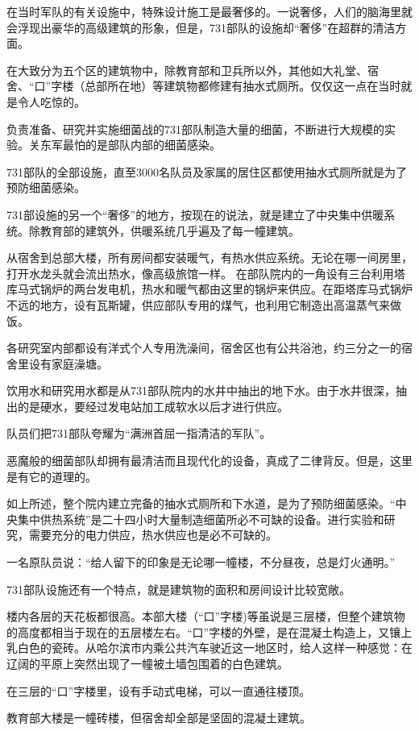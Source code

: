\documentclass[a4paper,12pt,UTF8,twoside]{ctexbook}
\begin{document}
在当时军队的有关设施中，特殊设计施工是最奢侈的。一说奢侈，人们的脑海里就会浮现出豪华的高级建筑的形象，但是，731部队的设施却“奢侈”在超群的清洁方面。

在大致分为五个区的建筑物中，除教育部和卫兵所以外，其他如大礼堂、宿舍、“口”字楼（总部所在地）等建筑物都修建有抽水式厕所。仅仅这一点在当时就是令人吃惊的。

负责准备、研究并实施细菌战的731部队制造大量的细菌，不断进行大规模的实验。关东军最怕的是部队内部的细菌感染。

731部队的全部设施，直至3000名队员及家属的居住区都使用抽水式厕所就是为了预防细菌感染。

731部设施的另一个“奢侈”的地方，按现在的说法，就是建立了中央集中供暖系统。除教育部的建筑外，供暖系统几乎遍及了每一幢建筑。

从宿舍到总部大楼，所有房间都安装暖气，有热水供应系统。无论在哪一间房里，打开水龙头就会流出热水，像高级旅馆一样。
在部队院内的一角设有三台利用塔库马式锅炉的两台发电机，热水和暖气都由这里的锅炉来供应。在距塔库马式锅炉不远的地方，设有瓦斯罐，供应部队专用的煤气，也利用它制造出高温蒸气来做饭。

各研究室内部都设有洋式个人专用洗澡间，宿舍区也有公共浴池，约三分之一的宿舍里设有家庭澡塘。

饮用水和研究用水都是从731部队院内的水井中抽出的地下水。由于水井很深，抽出的是硬水，要经过发电站加工成软水以后才进行供应。

队员们把731部队夸耀为“满洲首屈一指清洁的军队”。

恶魔般的细菌部队却拥有最清洁而且现代化的设备，真成了二律背反。但是，这里是有它的道理的。

如上所述，整个院内建立完备的抽水式厕所和下水道，是为了预防细菌感染。“中央集中供热系统”是二十四小时大量制造细菌所必不可缺的设备。进行实验和研究，需要充分的电力供应，热水供应也是必不可缺的。

一名原队员说：“给人留下的印象是无论哪一幢楼，不分昼夜，总是灯火通明。”

731部队设施还有一个特点，就是建筑物的面积和房间设计比较宽敞。

楼内各层的天花板都很高。本部大楼（“口”字楼)等虽说是三层楼，但整个建筑物的高度都相当于现在的五层楼左右。“口”字楼的外壁，是在混凝土构造上，又镶上乳白色的瓷砖。从哈尔滨市内乘公共汽车驶近这一地区时，给人这样一种感觉：在辽阔的平原上突然出现了一幢被土墙包围着的白色建筑。

在三层的“口”字楼里，设有手动式电梯，可以一直通往楼顶。

教育部大楼是一幢砖楼，但宿舍却全部是坚固的混凝土建筑。
\end{document}
